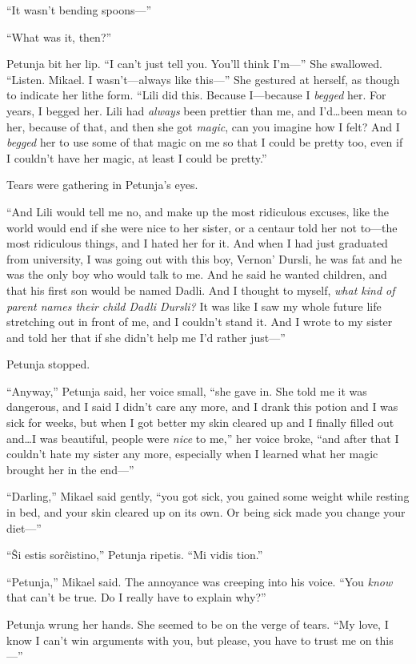 “It wasn’t bending spoons—”

“What was it, then?”

Petunja bit her lip. “I can’t just tell you. You’ll think I’m—” She swallowed. “Listen. Mikael. I wasn’t—always like this—” She gestured at herself, as though to indicate her lithe form. “Lili did this. Because I—because I \emph{begged} her. For years, I begged her. Lili had \emph{always} been prettier than me, and I’d…been mean to her, because of that, and then she got \emph{magic}, can you imagine how I felt? And I \emph{begged} her to use some of that magic on me so that I could be pretty too, even if I couldn’t have her magic, at least I could be pretty.”

Tears were gathering in Petunja’s eyes.

“And Lili would tell me no, and make up the most ridiculous excuses, like the world would end if she were nice to her sister, or a centaur told her not to—the most ridiculous things, and I hated her for it. And when I had just graduated from university, I was going out with this boy, Vernon' Dursli, he was fat and he was the only boy who would talk to me. And he said he wanted children, and that his first son would be named Dadli. And I thought to myself, \emph{what kind of parent names their child Dadli Dursli?} It was like I saw my whole future life stretching out in front of me, and I couldn’t stand it. And I wrote to my sister and told her that if she didn’t help me I’d rather just—”

Petunja stopped.

“Anyway,” Petunja said, her voice small, “she gave in. She told me it was dangerous, and I said I didn’t care any more, and I drank this potion and I was sick for weeks, but when I got better my skin cleared up and I finally filled out and…I was beautiful, people were \emph{nice} to me,” her voice broke, “and after that I couldn’t hate my sister any more, especially when I learned what her magic brought her in the end—”

“Darling,” Mikael said gently, “you got sick, you gained some weight while resting in bed, and your skin cleared up on its own. Or being sick made you change your diet—”

“Ŝi estis sorĉistino,” Petunja ripetis. “Mi vidis tion.”

“Petunja,” Mikael said. The annoyance was creeping into his voice. “You \emph{know} that can’t be true. Do I really have to explain why?”

Petunja wrung her hands. She seemed to be on the verge of tears. “My love, I know I can’t win arguments with you, but please, you have to trust me on this—”

